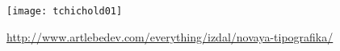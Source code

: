 \documentclass[11pt]{scrbook}
\begin{document}
\setlength\paperwidth@cx{\paperwidth}
\setlength\paperheight@cx{\paperheight}
\setlength\bindingcorrection{0.25in}



\drawtriallayout

\showequations

\printgeometryvalues
\readability

\newpage

\drawtriallayout

\readability

\newpage





\begin{figure}
\texttt{[image: tchichold01]}
\caption{\protect\url{http://www.artlebedev.com/everything/izdal/novaya-tipografika/}}
\end{figure}

%
%
%
%
\end{document}
